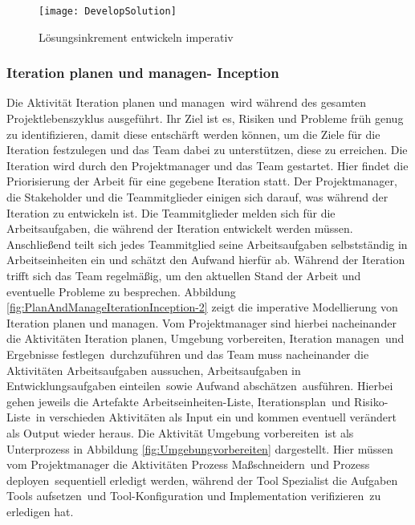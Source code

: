  
\begin{figure}[htp]
\begin{center}
  \texttt{[image: DevelopSolution]} %
  \caption{Lösungsinkrement entwickeln imperativ}
  \label{fig:Dev}
\end{center}
\end{figure}

\subsubsection{Iteration planen und managen- Inception}

Die Aktivität \grqq Iteration planen und managen\grqq \ wird während des gesamten Projektlebenszyklus ausgeführt. Ihr Ziel ist es, Risiken und Probleme früh genug zu identifizieren, damit diese entschärft werden können, um die Ziele für die Iteration festzulegen und das Team dabei zu unterstützen, diese zu erreichen.\newline
Die Iteration wird durch den Projektmanager und das Team gestartet. Hier findet die Priorisierung der Arbeit für eine gegebene Iteration statt. Der Projektmanager, die Stakeholder und die Teammitglieder einigen sich darauf, was während der Iteration zu entwickeln ist.\newline
Die Teammitglieder melden sich für die Arbeitsaufgaben, die während der Iteration entwickelt werden müssen. Anschließend teilt sich jedes Teammitglied seine Arbeitsaufgaben selbstständig in Arbeitseinheiten ein und schätzt den Aufwand hierfür ab.\newline
Während der Iteration trifft sich das Team regelmäßig, um den aktuellen Stand der Arbeit und eventuelle Probleme zu besprechen. \newline
Abbildung \ref{fig:PlanAndManageIterationInception-2} zeigt die imperative Modellierung von \grqq Iteration planen und managen\grqq. \newline
Vom Projektmanager sind hierbei nacheinander die Aktivitäten \grqq Iteration planen, Umgebung vorbereiten, Iteration managen\grqq \ und \grqq Ergebnisse festlegen\grqq \ durchzuführen und das Team muss nacheinander die Aktivitäten \grqq Arbeitsaufgaben aussuchen, Arbeitsaufgaben in Entwicklungsaufgaben einteilen\grqq \ sowie \grqq Aufwand abschätzen\grqq \ ausführen. Hierbei gehen jeweils die Artefakte \grqq Arbeitseinheiten-Liste, Iterationsplan\grqq \ und \grqq Risiko-Liste\grqq \ in verschieden Aktivitäten als Input ein und kommen eventuell verändert als Output wieder heraus. \newline
Die Aktivität \grqq Umgebung vorbereiten\grqq \ ist als Unterprozess in Abbildung \ref{fig:Umgebungvorbereiten} dargestellt. Hier müssen vom Projektmanager die Aktivitäten \grqq Prozess Maßschneidern\grqq \ und \grqq Prozess deployen\grqq \ sequentiell erledigt werden, während der Tool Spezialist die Aufgaben \grqq Tools aufsetzen\grqq \ und \grqq Tool-Konfiguration und Implementation verifizieren\grqq \ zu erledigen hat.


